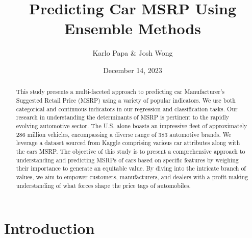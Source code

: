 \documentclass{article}
\title{Predicting Car MSRP Using Ensemble Methods}
\author{Karlo Papa & Josh Wong}
\date{December 14, 2023}
\begin{document}
\maketitle

\begin{abstract}
This study presents a multi-faceted approach to predicting car Manufacturer's Suggested Retail Price (MSRP) using a variety of popular indicators. We use both categorical and continuous indicators in our regression and classification tasks. Our research in understanding the determinants of MSRP is pertinent to the rapidly evolving automotive sector. The U.S. alone boasts an impressive fleet of approximately 286 million vehicles, encompassing a diverse range of 383 automotive brands. We leverage a dataset sourced from Kaggle comprising various car attributes along with the cars MSRP. The objective of this study is to present a comprehensive approach to understanding and predicting MSRPs of cars based on specific features by weighing their importance to generate an equitable value. By diving into the intricate branch of values, we aim to empower customers, manufacturers, and dealers with a profit-making understanding of what forces shape the price tags of automobiles. 

\end{abstract}



\section{Introduction}
\end{document}

